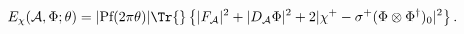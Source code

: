 \begin{equation}
 E_\chi(\mathcal{A},\Phi;\theta)=|\text{Pf}(2\pi\theta)|
 \Tr{}\left\{|F_{\mathcal{A}}|^2+|D_{\mathcal{A}}\Phi|^2
 +2|\chi^+-\sigma^+(\Phi\otimes\Phi^\dagger)_0|^2\right\}.
\end{equation}

